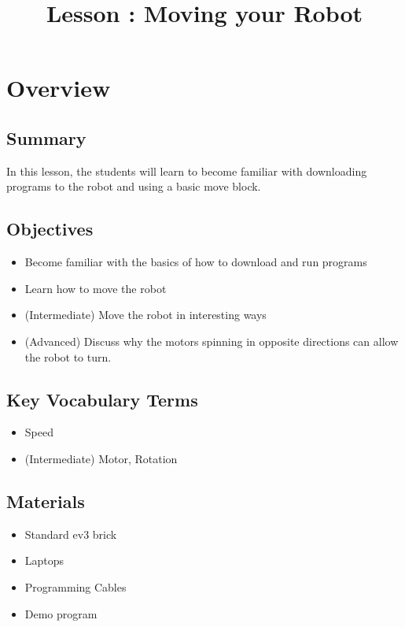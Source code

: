 \documentclass{lessonplan}
\title{Lesson \lessonNumber: Moving your Robot}
\author{\linkHome}
\date{}
\begin{document}
  \maketitle

  \section{Overview}
    \subsection{Summary}
      In this lesson, the students will learn to become familiar with downloading programs to the robot and using a basic move block.


    \subsection{Objectives}
    \begin{itemize}
      \item Become familiar with the basics of how to download and run programs
      \item Learn how to move the robot
      \item (Intermediate) Move the robot in interesting ways
      \item (Advanced) Discuss why the motors spinning in opposite directions can allow the robot to turn.
    \end{itemize}
    
    
    \subsection{Key Vocabulary Terms}
    \begin{itemize}
      \item Speed
      \item (Intermediate) Motor, Rotation
      
      
    \end{itemize}
    \subsection{Materials}
      \begin{itemize}
        \item Standard ev3 brick
        \item Laptops
        \item Programming Cables
        \item Demo program
      \end{itemize}
      
\end{document}
